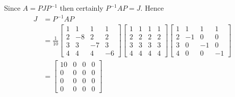 Since $A = PJP^{-1}$ then certainly $P^{-1}AP = J$. Hence
\begin{align*}
    J
    &= P^{-1}AP\\
    &= \frac{1}{10}\begin{bmatrix}
        1&1&1&1\\
        2&-8&2&2\\
        3&3&-7&3\\
        4&4&4&-6
    \end{bmatrix}  
    \begin{bmatrix}
        1&1&1&1 \\ 2&2&2&2 \\ 3&3&3&3 \\ 4&4&4&4
    \end{bmatrix}
    \begin{bmatrix}
        1 & 1 & 1 & 1\\
        2&-1&0&0\\
        3&0&-1&0\\
        4&0&0&-1
    \end{bmatrix}\\
    &=
    \begin{bmatrix*}
        10&0& 0 & 0 \\
        0&0&0&0\\
        0&0&0&0 \\
        0&0&0&0
    \end{bmatrix*}
\end{align*}